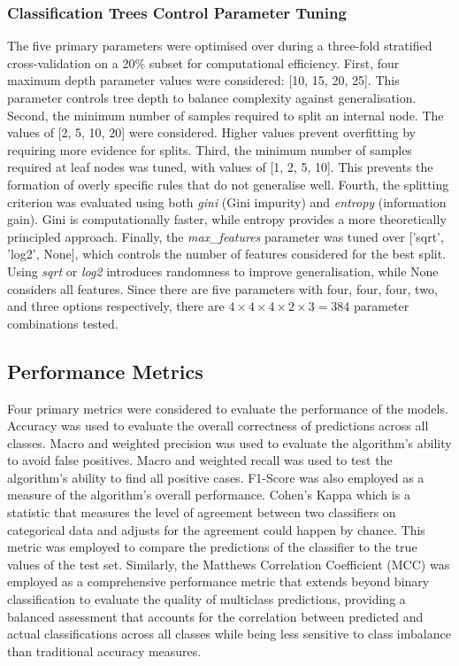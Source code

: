 \documentclass[10pt, conference]{IEEEtran}
\begin{document}
\subsubsection{Classification Trees Control Parameter Tuning}
The five primary parameters were optimised over during a three-fold stratified cross-validation on a 20\% subset for computational efficiency.  First, four maximum depth parameter values were considered: [10, 15, 20, 25]. This parameter controls tree depth to balance complexity against generalisation. Second, the minimum number of samples required to split an internal node. The values of [2, 5, 10, 20] were considered. Higher values prevent overfitting by requiring more evidence for splits. Third, the minimum number of samples required at leaf nodes was tuned, with values of [1, 2, 5, 10]. This prevents the formation of overly specific rules that do not generalise well. Fourth, the splitting criterion was evaluated using both \textit{gini} (Gini impurity) and \textit{entropy} (information gain). Gini is computationally faster, while entropy provides a more theoretically principled approach. Finally, the \textit{max\_features} parameter was tuned over ['sqrt', 'log2', None], which controls the number of features considered for the best split. Using \textit{sqrt} or \textit{log2} introduces randomness to improve generalisation, while None considers all features. Since there are five parameters with four, four, four, two, and three options respectively, there are $4 \times 4 \times 4 \times 2 \times 3 = 384$ parameter combinations tested. 


\subsection{Performance Metrics}
Four primary metrics were considered to evaluate the performance of the models. Accuracy was used to evaluate the overall correctness of predictions across all classes.  Macro and weighted precision was used to evaluate the algorithm's ability to avoid false positives. Macro and weighted recall was used to test the algorithm's ability to find all positive cases. F1-Score was also employed as a measure of the algorithm's overall performance. Cohen's Kappa which is a statistic that measures the level of agreement between two classifiers on categorical data and adjusts for the agreement could happen by chance. This metric was employed to compare the predictions of the classifier to the true values of the test set. Similarly, the Matthews Correlation Coefficient (MCC) was employed as a comprehensive performance metric that extends beyond binary classification to evaluate the quality of multiclass predictions, providing a balanced assessment that accounts for the correlation between predicted and actual classifications across all classes while being less sensitive to class imbalance than traditional accuracy measures.
\end{document}
